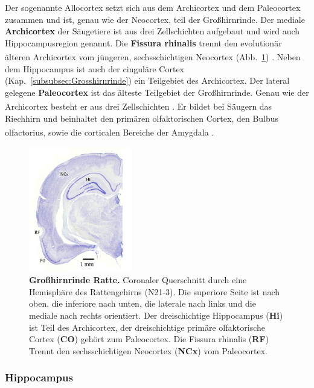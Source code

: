 \documentclass[12pt,a4paper,pdftex]{article}
\begin{document}
Der sogenannte Allocortex setzt sich aus dem Archicortex und dem Paleocortex zusammen und ist, genau wie der Neocortex, teil der Großhirnrinde. Der mediale \textbf{Archicortex} der Säugetiere ist aus drei Zellschichten aufgebaut und wird auch Hippocampusregion genannt. Die \textbf{Fissura rhinalis} trennt den evolutionär älteren Archicortex vom jüngeren, sechsschichtigen Neocortex (Abb.~\ref{fig:allocortex_ratte}) \textsuperscript{\cite[6]{storch2012lehrbuchzoo}}. Neben dem Hippocampus ist auch der cinguläre Cortex (Kap.~\ref{subsubsec:Grosshirnrinde}) ein Teilgebiet des Archicortex. Der lateral gelegene \textbf{Paleocortex} ist das älteste Teilgebiet der Großhirnrinde. Genau wie der Archicortex besteht er aus drei Zellschichten \textsuperscript{\cite[6]{storch2012lehrbuchzoo}}. Er bildet bei Säugern das Riechhirn und beinhaltet den primären olfaktorischen Cortex, den Bulbus olfactorius, sowie die corticalen Bereiche der Amygdala \textsuperscript{\cite[9]{trepel2011neuroanatomie}}.

\begin{figure}[H]
    \centering
    \includegraphics[width=0.4\textwidth]{pictures/Bilder_Jule/Ratte/RF.png}
    \caption[Großhirnrinde Ratte]{\textbf{Großhirnrinde Ratte.} Coronaler Querschnitt durch eine Hemisphäre des Rattengehirns (N21-3). Die superiore Seite ist nach oben, die inferiore nach unten, die laterale nach links und die mediale nach rechts orientiert. Der dreischichtige Hippocampus (\textbf{Hi}) ist Teil des Archicortex, der dreischichtige primäre olfaktorische Cortex (\textbf{CO}) gehört zum Paleocortex. Die Fissura rhinalis (\textbf{RF}) Trennt den sechsschichtigen Neocortex (\textbf{NCx}) vom Paleocortex.}
    \label{fig:allocortex_ratte}
\end{figure}{}

\subsubsection*{Hippocampus}
\label{subsubsec:Hippocampus} 
\end{document}
